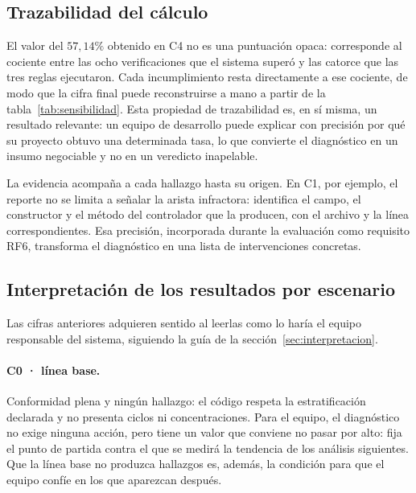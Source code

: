 \subsection{Trazabilidad del cálculo}
El valor del $57{,}14\%$ obtenido en C4 no es una puntuación opaca: corresponde al cociente entre las ocho verificaciones que el sistema superó y las catorce que las tres reglas ejecutaron. Cada incumplimiento resta directamente a ese cociente, de modo que la cifra final puede reconstruirse a mano a partir de la tabla~\ref{tab:sensibilidad}. Esta propiedad de trazabilidad es, en sí misma, un resultado relevante: un equipo de desarrollo puede explicar con precisión por qué su proyecto obtuvo una determinada tasa, lo que convierte el diagnóstico en un insumo negociable y no en un veredicto inapelable.

La evidencia acompaña a cada hallazgo hasta su origen. En C1, por ejemplo, el reporte no se limita a señalar la arista infractora: identifica el campo, el constructor y el método del controlador que la producen, con el archivo y la línea correspondientes. Esa precisión, incorporada durante la evaluación como requisito RF6, transforma el diagnóstico en una lista de intervenciones concretas.

\subsection{Interpretación de los resultados por escenario}
\label{sec:interpretacion-escenarios}
Las cifras anteriores adquieren sentido al leerlas como lo haría el equipo responsable del sistema, siguiendo la guía de la sección~\ref{sec:interpretacion}.

\paragraph{C0 · línea base.} Conformidad plena y ningún hallazgo: el código respeta la estratificación declarada y no presenta ciclos ni concentraciones. Para el equipo, el diagnóstico no exige ninguna acción, pero tiene un valor que conviene no pasar por alto: fija el punto de partida contra el que se medirá la tendencia de los análisis siguientes. Que la línea base no produzca hallazgos es, además, la condición para que el equipo confíe en los que aparezcan después.

